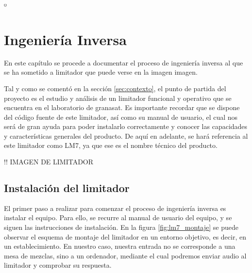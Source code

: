 º\chapter{Ingeniería Inversa} \label{cap:capitulo3}

En este capítulo se procede a documentar el proceso de ingeniería inversa al que se ha sometido a limitador que puede verse en la imagen {imagen}.

Tal y como se comentó en la sección \ref{sec:contexto}, el punto de partida del proyecto es el estudio y análisis de un limitador funcional y operativo que se encuentra en el laboratorio de \gls{granasat}. Es importante recordar que se dispone del código fuente de este limitador, así como su manual de usuario, el cual nos será de gran ayuda para poder instalarlo correctamente y conocer las capacidades y características generales del producto. De aquí en adelante, se hará referencia al este limitador como \acrshort{LM7}, ya que ese es el nombre técnico del producto.

!! IMAGEN DE LIMITADOR
\label{img:lms7_cls}

\section{Instalación del limitador}

El primer paso a realizar para comenzar el proceso de ingeniería inversa es instalar el equipo. Para ello, se recurre al manual de usuario del equipo, y se siguen las instrucciones de instalación. En la figura \ref{fig:lm7_montaje} se puede observar el esquema de montaje del limitador en un entorno objetivo, es decir, en un establecimiento. En nuestro caso, nuestra entrada no se corresponde a una mesa de mezclas, sino a un ordenador, mediante el cual podremos enviar audio al limitador y comprobar su respuesta.


